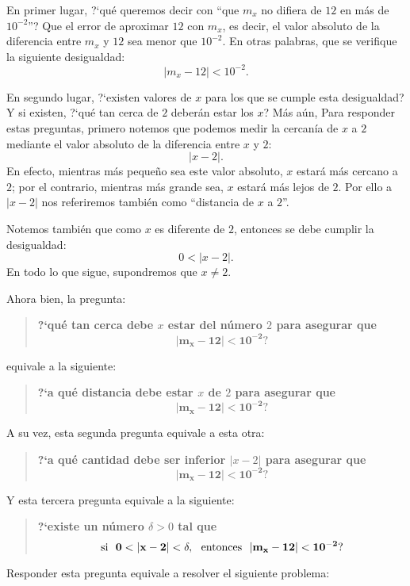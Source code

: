 En primer lugar, ?`qué queremos decir con ``que $m_x$ no difiera de $12$ en más de $10^{-2}$''? Que
el error de aproximar $12$ con $m_x$, es decir, el valor absoluto de la diferencia entre $m_x$ y
$12$ sea menor que $10^{-2}$. En otras palabras, que se verifique la siguiente desigualdad:
\[
|m_x - 12| < 10^{-2}.
\]

En segundo lugar, ?`existen valores de $x$ para los que se cumple esta desigualdad? Y si existen,
?`qué tan cerca de $2$ deberán estar los $x$? Más aún,  Para responder estas preguntas, primero
notemos que podemos medir la cercanía de $x$ a $2$ mediante el valor absoluto de la diferencia
entre $x$ y $2$:
\[
|x - 2|.
\]
En efecto, mientras más pequeño sea este valor absoluto, $x$ estará más cercano a $2$; por el
contrario, mientras más grande sea, $x$ estará más lejos de $2$. Por ello a $|x - 2|$ nos
referiremos también como ``distancia de $x$ a $2$''.

Notemos también que como $x$ es diferente de $2$, entonces se debe cumplir la desigualdad:
\[
0 < |x - 2|.
\]
En todo lo que sigue, supondremos que $x\neq 2$.

Ahora bien, la pregunta:
\begin{quote}
{\bfseries ?`qué tan cerca debe $x$ estar del número $2$ para asegurar que
\[
\bm{|m_x - 12| < 10^{-2}\text{?}}
\]
}
\end{quote}
equivale a la siguiente:
\begin{quote}
{\bfseries ?`a qué distancia debe estar $x$ de $2$ para asegurar que
\[
\bm{|m_x - 12| < 10^{-2}\text{?}}
\]
}
\end{quote}
A su vez, esta segunda pregunta equivale a esta otra:
\begin{quote}
{\bfseries ?`a qué cantidad debe ser inferior $|x - 2|$ para asegurar que
\[
\bm{|m_x - 12| < 10^{-2}\text{?}}
\]
}
\end{quote}
Y esta tercera pregunta equivale a la siguiente:
\begin{quote}
{\bfseries ?`existe un número $\delta > 0$ tal que
\[
\bf{\text{si } \ 0 < |x - 2| < \delta, \ \text{ entonces } \ |m_x - 12| < 10^{-2}\text{?}}
\]
}
\end{quote}

Responder esta pregunta equivale a resolver el siguiente problema:

